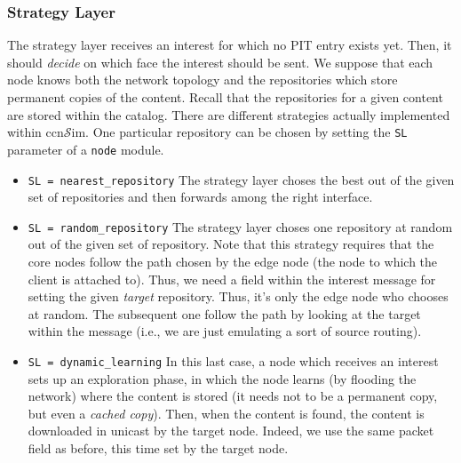 \documentclass{article}
\newcommand{\ccnsim}{ccn$\mathcal{S}$im}
\begin{document}
\subsubsection{Strategy Layer}
The strategy layer receives an interest for which no PIT entry exists yet. Then, it should \emph{decide} on which face the interest should be sent. We suppose that each node knows both the network topology and the repositories which store permanent copies of the content. Recall that the repositories for a given content are stored within the catalog. There are different strategies actually implemented within \ccnsim. One particular repository can be chosen by setting the \verb|SL| parameter of a \verb|node| module. 
\begin{itemize}
    \item \verb|SL = nearest_repository| The strategy layer choses the best out of the given set of repositories and then forwards among the right interface. 
    \item \verb|SL = random_repository|  The strategy layer choses one repository at random out of the given set of repository. Note that this strategy requires that the core nodes follow the path chosen by the edge node (the node to which the client is attached to). Thus, we need a field within the interest message for setting the given \emph{target} repository. Thus, it's only the edge node who chooses at random. The subsequent one follow the path by looking at the target within the message (i.e., we are just emulating a sort of source routing). 
    \item \verb|SL = dynamic_learning| In this last case, a node which receives an interest sets up an exploration phase, in which the node learns (by flooding the network) where the content is stored (it needs not to be a permanent copy, but even a \emph{cached copy}). Then, when the content is found, the content is downloaded in unicast by the target node. Indeed, we use the same packet field as before, this time set by the target node. 
\end{itemize}
\end{document}
